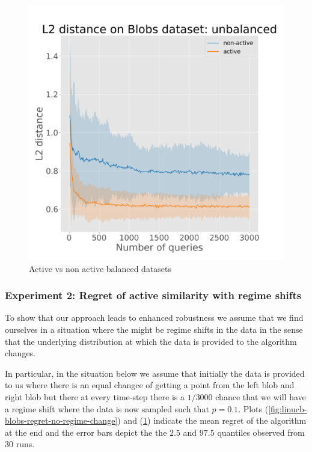 \documentclass{article}
\begin{document}
\begin{figure}[!h]
\begin{minipage}{.45\textwidth}
    \includegraphics[width=\linewidth]{active-vs-base-blobs-l2-loss_unbalanced-ci}
    \caption{Active vs non active balanced datasets}\label{fig:linucb-blobs-regret-regime-change}
  \end{minipage}
\end{figure}


\subsubsection{Experiment 2: Regret of active similarity with regime shifts}
To show that our approach leads to enhanced robustness we assume that we find ourselves in a situation
where the might be regime shifts in the data in the sense that the underlying distribution at which the data is provided
to the algorithm changes.

In particular, in the situation below we assume that initially the data is provided to us where there is an equal changce of getting a point
from the left blob and right blob but there at every time-step there is a $1/3000$ chance that
we will have a regime shift where the data is now sampled such that $p = 0.1$.
Plots (\ref{fig:linucb-blobs-regret-no-regime-change}) and (\ref{fig:linucb-blobs-regret-regime-change}) indicate the mean regret of the algorithm at the end
and the error bars depict the the $2.5$ and $97.5$ quantiles observed from 30 runs.
\end{document}

